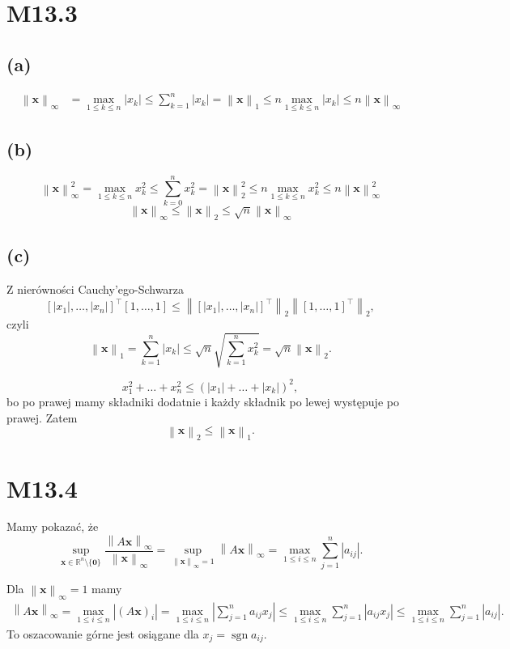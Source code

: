 \documentclass[a4paper, 12pt]{article}
\DeclareMathOperator{\sgn}{sgn}
\newcommand{\norm}[1]{\left\lVert #1 \right\rVert}
\newcommand{\modulus}[1]{\left| #1 \right|}
\newcommand{\abs}{\modulus}
\newcommand{\+}{\enspace}
\begin{document}
\section*{M13.3}
\subsection*{(a)}
\begin{align*}
\norm{\mathbf{x}}_∞
	&= \max_{1 ≤ k ≤ n} \abs{x_k}
	≤ ∑_{k=1}^n \abs{x_k}
	= \norm{\mathbf{x}}_1
	≤ n\max_{1 ≤ k ≤ n} \abs{x_k}
	≤ n\norm{\mathbf{x}}_∞
\end{align*}

\subsection*{(b)}
$$
	\norm{\mathbf{x}}_∞^2
	= \max_{1 ≤ k ≤ n} x_k^2
	≤ ∑_{k=0}^n x_k^2
	= \norm{\mathbf{x}}_2^2
	≤ n\max_{1 ≤ k ≤ n} x_k^2
	≤ n \norm{\mathbf{x}}_∞^2
$$
$$
\norm{\mathbf{x}}_∞ ≤ \norm{\mathbf{x}}_2 ≤ \sqrt{n}\norm{\mathbf{x}}_∞$$

\subsection*{(c)}
Z nierówności Cauchy'ego-Schwarza
$$
\left[\abs{x_1}, …, \abs{x_n}\right]^\top\left[1, …, 1\right]
≤ \norm{\left[\abs{x_1}, …, \abs{x_n}\right]^\top}_2 \norm{\left[1, …, 1\right]^\top}_2,
$$
czyli
$$
	\norm{\mathbf{x}}_1
	= ∑_{k=1}^n \abs{x_k}
	≤ \sqrt{n}\sqrt{∑_{k=1}^n x_k^2}
	= \sqrt{n}\norm{\mathbf{x}}_2.
$$

$$x_1^2 + … + x_n^2 ≤ \left(\abs{x_1} + … + \abs{x_k}\right)^2,$$
bo po prawej mamy składniki dodatnie i każdy składnik po lewej występuje po
prawej.
Zatem
$$\norm{\mathbf{x}}_2 ≤ \norm{\mathbf{x}}_1.$$

\section*{M13.4}
Mamy pokazać, że
$$\sup_{\mathbf{x} ∈ ℝ^n \setminus \{\mathbf{0}\}}
\frac{\norm{A\mathbf{x}}_∞}{\norm{\mathbf{x}}_∞}
= \sup_{\norm{\mathbf{x}}_∞ = 1} \norm{A\mathbf{x}}_∞
= \max_{1 ≤ i ≤ n} ∑_{j=1}^n \abs{a_{ij}}.$$

Dla $\norm{\mathbf{x}}_∞ = 1$ mamy
\begin{align*}
\norm{A\mathbf{x}}_∞
= \max_{1 ≤ i ≤ n} \abs{\left(A\mathbf{x}\right)_i}
= \max_{1 ≤ i ≤ n} \abs{∑_{j=1}^n a_{ij} x_j}
≤ \max_{1 ≤ i ≤ n} ∑_{j=1}^n \abs{a_{ij} x_j}
≤ \max_{1 ≤ i ≤ n} ∑_{j=1}^n \abs{a_{ij}}.
\end{align*}
To oszacowanie górne jest osiągane dla $x_j = \sgn a_{ij}$.
\end{document}
